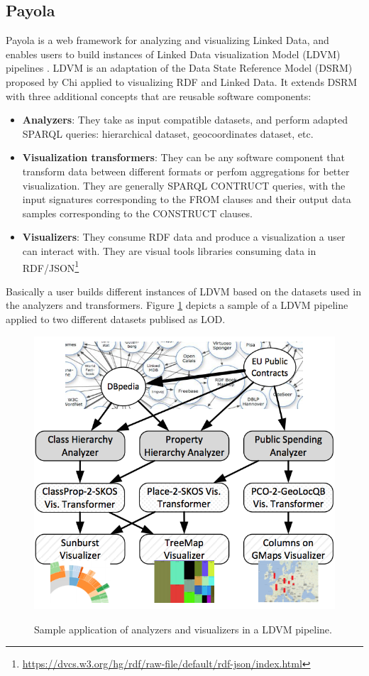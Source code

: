 \subsection{Payola}
Payola \cite{payola13} is a web framework for analyzing and visualizing Linked Data, and enables users to build instances of Linked Data visualization Model (LDVM) pipelines \cite{brunetti13}. LDVM is an adaptation of the Data State Reference Model (DSRM) proposed by Chi \cite{chi2000} applied to visualizing RDF and Linked Data. It extends DSRM with three additional concepts that are reusable software components:
\begin{itemize}
\item \textbf{Analyzers}: They take as input compatible datasets, and perform adapted SPARQL queries: hierarchical dataset, geocoordinates dataset, etc.  
\item \textbf{Visualization transformers}: They can be any software component that transform data between different formats or perfom aggregations for better visualization. They are generally SPARQL CONTRUCT queries, with the input signatures corresponding to the FROM clauses and their output data samples corresponding to the CONSTRUCT clauses.
\item \textbf{Visualizers}: They consume RDF data and produce a visualization a user can interact with. They are visual tools libraries consuming data in RDF/JSON\footnote{\url{https://dvcs.w3.org/hg/rdf/raw-file/default/rdf-json/index.html}}
\end{itemize}
Basically a user builds different instances of LDVM based on the datasets used in the analyzers and transformers. Figure \ref{fig:ldvm-lod} depicts a sample of a LDVM pipeline applied to two different datasets publised as LOD.

\begin{figure}
\center
\includegraphics[scale=0.8]{img/ldvm-lod.png}
\label{fig:ldvm-lod}
\caption{Sample application of analyzers and visualizers in a LDVM pipeline.}
\end{figure}


